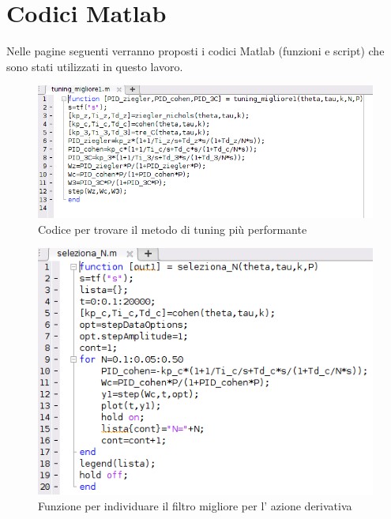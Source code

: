 \documentclass[Lau,noexaminfo]{sapthesis}
\begin{document}
	\chapter{Codici Matlab}
	Nelle pagine seguenti verranno proposti i codici Matlab (funzioni e script) che sono stati utilizzati in questo lavoro.\newpage
	\begin{figure}
		\includegraphics[scale=0.55]{tuning_migliore}
		\caption{Codice per trovare il metodo di tuning più performante}
	\end{figure}
	\begin{figure}
		\includegraphics[scale=0.6]{seleziona_n}
		\caption{Funzione per individuare il filtro migliore per l' azione derivativa}
	\end{figure}
\end{document}

